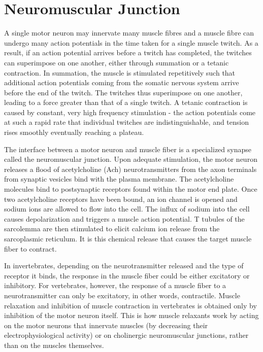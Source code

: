 \hypertarget{neuromuscular-junction}{%
\section{Neuromuscular Junction}\label{neuromuscular-junction}}

A single motor neuron may innervate many muscle fibres and a muscle fibre can undergo many action potentials in the time taken for a single muscle twitch. As a result, if an action potential arrives before a twitch has completed, the twitches can superimpose on one another, either through summation or a tetanic contraction. In summation, the muscle is stimulated repetitively such that additional action potentials coming from the somatic nervous system arrive before the end of the twitch. The twitches thus superimpose on one another, leading to a force greater than that of a single twitch. A tetanic contraction is caused by constant, very high frequency stimulation - the action potentials come at such a rapid rate that individual twitches are indistinguishable, and tension rises smoothly eventually reaching a plateau.

The interface between a motor neuron and muscle fiber is a specialized synapse called the neuromuscular junction. Upon adequate stimulation, the motor neuron releases a flood of acetylcholine (Ach) neurotransmitters from the axon terminals from synaptic vesicles bind with the plasma membrane. The acetylcholine molecules bind to postsynaptic receptors found within the motor end plate. Once two acetylcholine receptors have been bound, an ion channel is opened and sodium ions are allowed to flow into the cell. The influx of sodium into the cell causes depolarization and triggers a muscle action potential. T tubules of the sarcolemma are then stimulated to elicit calcium ion release from the sarcoplasmic reticulum. It is this chemical release that causes the target muscle fiber to contract.

In invertebrates, depending on the neurotransmitter released and the type of receptor it binds, the response in the muscle fiber could be either excitatory or inhibitory. For vertebrates, however, the response of a muscle fiber to a neurotransmitter can only be excitatory, in other words, contractile. Muscle relaxation and inhibition of muscle contraction in vertebrates is obtained only by inhibition of the motor neuron itself. This is how muscle relaxants work by acting on the motor neurons that innervate muscles (by decreasing their electrophysiological activity) or on cholinergic neuromuscular junctions, rather than on the muscles themselves.

